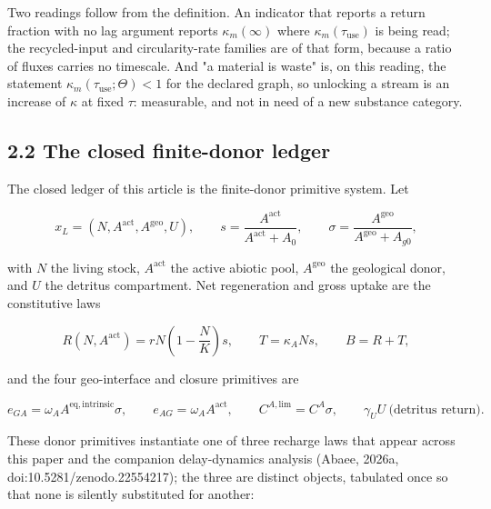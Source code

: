 \documentclass[11pt]{article}
\begin{document}
Two readings follow from the definition. An indicator that reports a return fraction with no lag argument reports \(\kappa_m(\infty)\) where \(\kappa_m(\tau_{\mathrm{use}})\) is being read; the recycled-input and circularity-rate families are of that form, because a ratio of fluxes carries no timescale. And "a material is waste" is, on this reading, the statement \(\kappa_m(\tau_{\mathrm{use}};\Theta)<1\) for the declared graph, so unlocking a stream is an increase of \(\kappa\) at fixed \(\tau\): measurable, and not in need of a new substance category.

\subsection*{2.2 The closed finite-donor ledger}\label{22-the-closed-finite-donor-ledger}

The closed ledger of this article is the finite-donor primitive system. Let 

$$x_L = (N, A^{\mathrm{act}}, A^{\mathrm{geo}}, U), \qquad s = \frac{A^{\mathrm{act}}}{A^{\mathrm{act}} + A_0}, \qquad \sigma = \frac{A^{\mathrm{geo}}}{A^{\mathrm{geo}} + A_{g0}},$$

 with \(N\) the living stock, \(A^{\mathrm{act}}\) the active abiotic pool, \(A^{\mathrm{geo}}\) the geological donor, and \(U\) the detritus compartment. Net regeneration and gross uptake are the constitutive laws 

$$R(N, A^{\mathrm{act}}) = rN\left(1 - \frac{N}{K}\right)s, \qquad T = \kappa_A N s, \qquad B = R + T,$$

 and the four geo-interface and closure primitives are 

$$e_{GA} = \omega_A A^{\mathrm{eq,intrinsic}} \sigma, \qquad e_{AG} = \omega_A A^{\mathrm{act}}, \qquad C^{A,\mathrm{lim}} = C^A \sigma, \qquad \gamma_U U \ \text{(detritus return)}.$$



These donor primitives instantiate one of three recharge laws that appear across this paper and the companion delay-dynamics analysis (Abaee, 2026a, doi:10.5281/\allowbreak{}zenodo.22554217); the three are distinct objects, tabulated once so that none is silently substituted for another:
\end{document}
